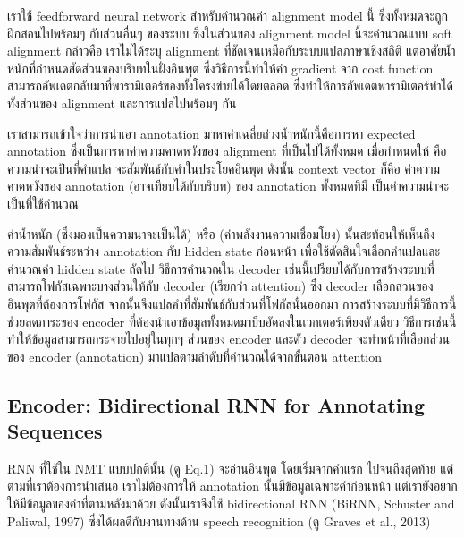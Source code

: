 \documentclass[17pt,fancychapters]{report}
\newcommand{\myeq}[1]{
  \scalebox{1.1}{$ #1 $}
}
\begin{document}
เราใช้ feedforward neural network สำหรับคำนวณค่า alignment model นี้ ซึ่งทั้งหมดจะถูกฝึกสอนไปพร้อมๆ กับส่วนอื่นๆ ของระบบ  ซึ่งในส่วนของ alignment model นี้จะคำนวณแบบ soft alignment กล่าวคือ เราไม่ได้ระบุ alignment ที่ชัดเจนเหมือกับระบบแปลภาษาเชิงสถิติ แต่อาศัยน้ำหนักที่กำหนดสัดส่วนของบริบทในฝั่งอินพุต ซึ่งวิธีการนี้ทำให้ค่า gradient จาก cost function สามารถอัพเดตกลับมาที่พารามิเตอร์ของทั้งโครงข่ายได้โดยตลอด ซึ่งทำให้การอัพเดตพารามิเตอร์ทำได้ทั้งส่วนของ alignment และการแปลไปพร้อมๆ กัน

เราสามารถเข้าใจว่าการนำเอา annotation มาหาค่าเฉลี่ยถ่วงน้ำหนักนี้คือการหา expected annotation ซึ่งเป็นการหาค่าความคาดหวังของ alignment ที่เป็นไปได้ทั้งหมด เมื่อกำหนดให้ \myeq{ \alpha_{ij} }คือความน่าจะเป้นที่คำแปล \myeq{ y_i } จะสัมพันธ์กับคำในประโยคอินพุต \myeq{x_j} ดังนั้น context vector \myeq{c_i} ก็คือ ค่าความคาดหวังของ annotation (อาจเทียบได้กับบริบท) ของ annotation ทั้งหมดที่มี \myeq{a_{ij}} เป็นค่าความน่าจะเป็นที่ใช้คำนวณ

ค่าน้ำหนัก (ซึ่งมองเป็นความน่าจะเป็นได้) \myeq{a_{ij}}หรือ\myeq{e_{ij}} (ค่าพลังงานความเชื่อมโยง) นั้นสะท้อนให้เห็นถึงความสัมพันธ์ระหว่าง annotation\myeq{h_j} กับ hidden state ก่อนหน้า \myeq{s_{i-1}} เพื่อใช้ตัดสินใจเลือกคำแปลและคำนวณค่า hidden state ถัดไป วิธีการคำนวณใน decoder เช่นนี้เปรียบได้กับการสร้างระบบที่สามารถโฟกัสเฉพาะบางส่วนให้กับ decoder (เรียกว่า attention) ซึ่ง decoder เลือกส่วนของอินพุตที่ต้องการโฟกัส จากนั้นจึงแปลคำที่สัมพันธ์กับส่วนที่โฟกัสนั้นออกมา การสร้างระบบที่มีวิธีการนี้ช่วยลดภาระของ encoder ที่ต้องนำเอาข้อมูลทั้งหมดมาบีบอัดลงในเวกเตอร์เพียงตัวเดียว วิธีการเช่นนี้ทำให้ข้อมูลสามารถกระจายไปอยู่ในทุกๆ ส่วนของ encoder และตัว decoder จะทำหน้าที่เลือกส่วนของ encoder (annotation) มาแปลตามลำดับที่คำนวณได้จากขั้นตอน attention

\subsection{Encoder: Bidirectional RNN for Annotating Sequences}

RNN ที่ใช้ใน NMT แบบปกตินั้น (ดู Eq.1) จะอ่านอินพุต \myeq{x} โดยเริ่มจากคำแรก \myeq{x_1} ไปจนถึงสุดท้าย \myeq{ x_{\scaleto{T_x}{5pt}}} แต่ตามที่เราต้องการนำเสนอ เราไม่ต้องการให้ annotation นั้นมีข้อมูลเฉพาะคำก่อนหน้า แต่เรายังอยากให้มีข้อมูลของคำที่ตามหลังมาด้วย ดังนั้นเราจึงใช้ bidirectional RNN (BiRNN, Schuster and Paliwal, 1997) ซึ่งได้ผลดีกับงานทางด้าน speech recognition (ดู  Graves et al., 2013)
\end{document}
